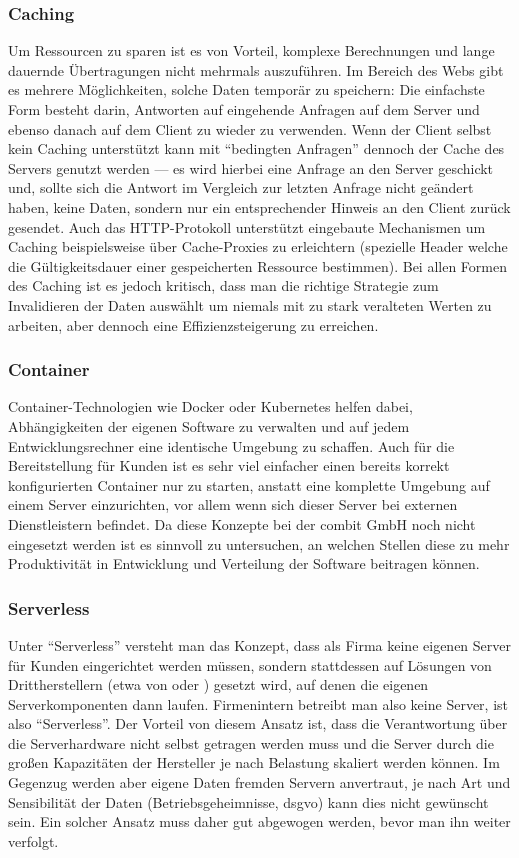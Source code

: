 \subsubsection{Caching}
Um Ressourcen zu sparen ist es von Vorteil, komplexe Berechnungen und lange dauernde Übertragungen nicht mehrmals auszuführen. Im Bereich des Webs gibt es mehrere Möglichkeiten, solche Daten temporär zu speichern: Die einfachste Form besteht darin, Antworten auf eingehende Anfragen auf dem Server und ebenso danach auf dem Client zu wieder zu verwenden. Wenn der Client selbst kein Caching unterstützt kann mit ``bedingten Anfragen'' dennoch der Cache des Servers genutzt werden --- es wird hierbei eine Anfrage an den Server geschickt und, sollte sich die Antwort im Vergleich zur letzten Anfrage nicht geändert haben, keine Daten, sondern nur ein entsprechender Hinweis an den Client zurück gesendet. Auch das HTTP-Protokoll unterstützt eingebaute Mechanismen um Caching beispielsweise über Cache-Proxies zu erleichtern (spezielle Header welche die Gültigkeitsdauer einer gespeicherten Ressource bestimmen). Bei allen Formen des Caching ist es jedoch kritisch, dass man die richtige Strategie zum Invalidieren der Daten auswählt um niemals mit zu stark veralteten Werten zu arbeiten, aber dennoch eine Effizienzsteigerung zu erreichen.

\subsubsection{Container}
Container-Technologien wie Docker oder Kubernetes helfen dabei, Abhängigkeiten der eigenen Software zu verwalten und auf jedem Entwicklungsrechner eine identische Umgebung zu schaffen. Auch für die Bereitstellung für Kunden ist es sehr viel einfacher einen bereits korrekt konfigurierten Container nur zu starten, anstatt eine komplette Umgebung auf einem Server einzurichten, vor allem wenn sich dieser Server bei externen Dienstleistern befindet. Da diese Konzepte bei der combit GmbH noch nicht eingesetzt werden ist es sinnvoll zu untersuchen, an welchen Stellen diese zu mehr Produktivität in Entwicklung und Verteilung der Software beitragen können.

\subsubsection{Serverless}
Unter ``Serverless'' versteht man das Konzept, dass als Firma keine eigenen Server für Kunden eingerichtet werden müssen, sondern stattdessen auf Lösungen von Drittherstellern (etwa  von  oder ) gesetzt wird, auf denen die eigenen Serverkomponenten dann laufen. Firmenintern betreibt man also keine Server, ist also ``Serverless''. Der Vorteil von diesem Ansatz ist, dass die Verantwortung über die Serverhardware nicht selbst getragen werden muss und die Server durch die großen Kapazitäten der Hersteller je nach Belastung skaliert werden können. Im Gegenzug werden aber eigene Daten fremden Servern anvertraut, je nach Art und Sensibilität der Daten (Betriebsgeheimnisse, \gls{dsgvo}) kann dies nicht gewünscht sein. Ein solcher Ansatz muss daher gut abgewogen werden, bevor man ihn weiter verfolgt.

